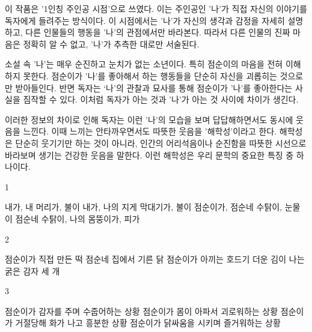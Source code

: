 \documentclass[fs9,seriesRus]{korfarm-base}
\begin{document}
{이 작품은 '1인칭 주인공 시점'으로 쓰였다. 이는 주인공인 '나'가 직접 자신의 이야기를 독자에게 들려주는 방식이다. 이 시점에서는 '나'가 자신의 생각과 감정을 자세히 설명하고, 다른 인물들의 행동을 '나'의 관점에서만 바라본다. 따라서 다른 인물의 진짜 마음은 정확히 알 수 없고, '나'가 추측한 대로만 서술된다.

소설 속 '나'는 매우 순진하고 눈치가 없는 소년이다. 특히 점순이의 마음을 전혀 이해하지 못한다. 점순이가 '나'를 좋아해서 하는 행동들을 단순히 자신을 괴롭히는 것으로만 받아들인다. 반면 독자는 ‘나’의 관찰과 묘사를 통해 점순이가 '나'를 좋아한다는 사실을 짐작할 수 있다. 이처럼 독자가 아는 것과 '나'가 아는 것 사이에 차이가 생긴다.

이러한 정보의 차이로 인해 독자는 이런 '나'의 모습을 보며 답답해하면서도 동시에 웃음을 느낀다. 이때 느끼는 안타까우면서도 따뜻한 웃음을 '해학성'이라고 한다. 해학성은 단순히 웃기기만 하는 것이 아니라, 인간의 어리석음이나 순진함을 따뜻한 시선으로 바라보며 생기는 건강한 웃음을 말한다. 이런 해학성은 우리 문학의 중요한 특징 중 하나이다.
}


\kfActivityBg \par{}
\par{}\par\nopagebreak[4]\smallskip\nopagebreak[4]
\kfBeginMC
\begin{kfSentenceUnit}{1}{}
\begin{kfChoices}
\kfChoice 내가, 내 머리가, 불이
\kfChoice 내가, 나의 지게 막대기가, 불이
\kfChoice 점순이가, 점순네 수탉이, 눈물이
\kfChoice 점순네 수탉이, 나의 몸뚱이가, 피가
\end{kfChoices}
\end{kfSentenceUnit}

\begin{kfSentenceUnit}{2}{}
\begin{kfChoices}
\kfChoice 점순이가 직접 만든 떡
\kfChoice 점순네 집에서 기른 닭
\kfChoice 점순이가 아끼는 호드기
\kfChoice 더운 김이 나는 굵은 감자 세 개
\end{kfChoices}
\end{kfSentenceUnit}

\begin{kfSentenceUnit}{3}{}
\begin{kfChoices}
\kfChoice 점순이가 감자를 주며 수줍어하는 상황
\kfChoice 점순이가 몸이 아파서 괴로워하는 상황
\kfChoice 점순이가 거절당해 화가 나고 흥분한 상황
\kfChoice 점순이가 닭싸움을 시키며 즐거워하는 상황
\end{kfChoices}
\end{kfSentenceUnit}
\end{document}
